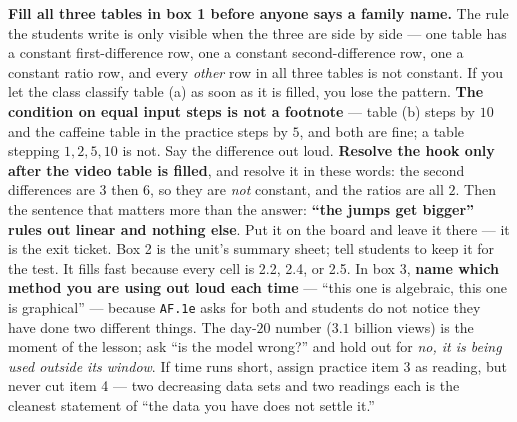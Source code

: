 \documentclass[10pt]{article}
\begin{document}
\boxguard[18]
\begin{teachernote}
    \textbf{Fill all three tables in box 1 before anyone says a family name.} The rule the students
    write is only visible when the three are side by side --- one table has a constant first-difference
    row, one a constant second-difference row, one a constant ratio row, and every \emph{other} row in
    all three tables is not constant. If you let the class classify table (a) as soon as it is filled,
    you lose the pattern. \textbf{The condition on equal input steps is not a footnote} --- table (b)
    steps by $10$ and the caffeine table in the practice steps by $5$, and both are fine; a table
    stepping $1, 2, 5, 10$ is not. Say the difference out loud. \textbf{Resolve the hook only after
    the video table is filled}, and resolve it in these words: the second differences are $3$ then
    $6$, so they are \emph{not} constant, and the ratios are all $2$. Then the sentence that matters
    more than the answer: \textbf{``the jumps get bigger'' rules out linear and nothing else}. Put it
    on the board and leave it there --- it is the exit ticket. Box 2 is the unit's summary sheet;
    tell students to keep it for the test. It fills fast because every cell is 2.2, 2.4, or 2.5. In
    box 3, \textbf{name which method you are using out loud each time} --- ``this one is algebraic,
    this one is graphical'' --- because \texttt{AF.1e} asks for both and students do not notice they
    have done two different things. The day-$20$ number ($3.1$ billion views) is the moment of the
    lesson; ask ``is the model wrong?'' and hold out for \emph{no, it is being used outside its
    window}. If time runs short, assign practice item 3 as reading, but never cut item 4 --- two
    decreasing data sets and two readings each is the cleanest statement of ``the data you have does
    not settle it.''
\end{teachernote}
\end{document}
